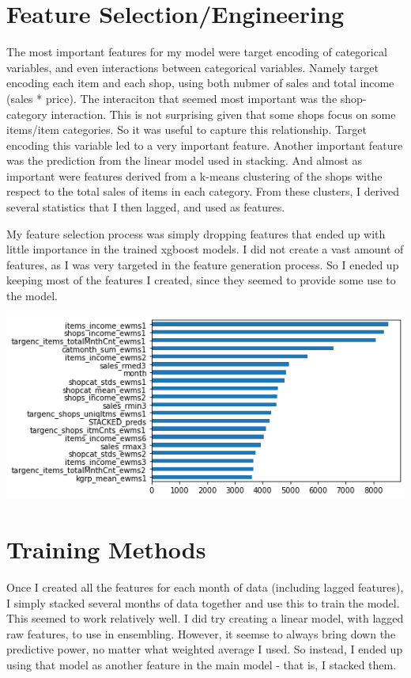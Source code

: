 \documentclass[a4paper]{article}
\begin{document}
\section{Feature Selection/Engineering}

The most important features for my model were target encoding of categorical variables, and even interactions between categorical variables. Namely target encoding each item and each shop, using both nubmer of sales and total income (sales * price). The interaciton that seemed most important was the shop-category interaction. This is not surprising given that some shops focus on some items/item categories. So it was useful to capture this relationship.
Target encoding this variable led to a very important feature. Another important feature was the prediction from the linear model used in stacking. And almost as important were features derived from a k-means clustering of the shops withe respect to the total sales of items in each category. From these clusters, I derived several statistics that I then lagged, and used as features.

My feature selection process was simply dropping features that ended up with little importance in the trained xgboost models. I did not create a vast amount of features, as I was very targeted in the feature generation process. So I eneded up keeping most of the features I created, since they seemed to provide some use to the model.


\begin{center}
  \includegraphics[width=15cm]{Top20.png}
\end{center}

\section{Training Methods}

Once I created all the features for each month of data (including lagged features), I simply stacked several months of data together and use this to train the model. This seemed to work relatively well. I did try creating a linear model, with lagged raw features, to use in ensembling. However, it seemse to always bring down the predictive power, no matter what weighted average I used. So instead, I ended up using that model as another feature in the main model - that is, I stacked them.
\end{document}
